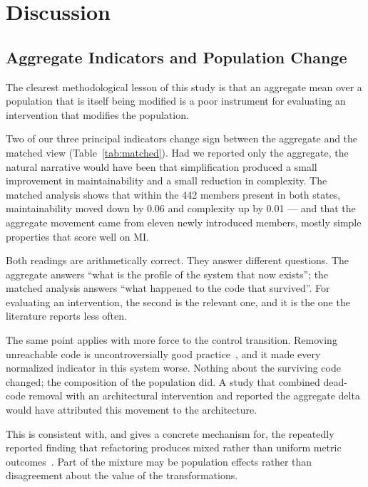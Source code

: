 \documentclass{sbc2019}%
\begin{document}
\section{Discussion}\label{sec:discussion}

\subsection{Aggregate Indicators and Population Change}

The clearest methodological lesson of this study is that an aggregate mean over
a population that is itself being modified is a poor instrument for evaluating
an intervention that modifies the population.

Two of our three principal indicators change sign between the aggregate and the
matched view (Table~\ref{tab:matched}). Had we reported only the aggregate, the
natural narrative would have been that simplification produced a small
improvement in maintainability and a small reduction in complexity. The matched
analysis shows that within the 442 members present in both states, maintainability
moved down by 0.06 and complexity up by 0.01 --- and that the aggregate movement
came from eleven newly introduced members, mostly simple properties that score
well on MI\@.

Both readings are arithmetically correct. They answer different questions. The
aggregate answers ``what is the profile of the system that now exists''; the
matched analysis answers ``what happened to the code that survived''. For
evaluating an intervention, the second is the relevant one, and it is the one
the literature reports less often.

The same point applies with more force to the control transition. Removing
unreachable code is uncontroversially good practice~\cite{romano2020,eder2012},
and it made every normalized indicator in this system worse. Nothing about the
surviving code changed; the composition of the population did. A study that
combined dead-code removal with an architectural intervention and reported the
aggregate delta would have attributed this movement to the architecture.

This is consistent with, and gives a concrete mechanism for, the repeatedly
reported finding that refactoring produces mixed rather than uniform metric
outcomes~\cite{szoke2017,bavota2015,palomba2018}. Part of the mixture may be
population effects rather than disagreement about the value of the
transformations.
\end{document}
